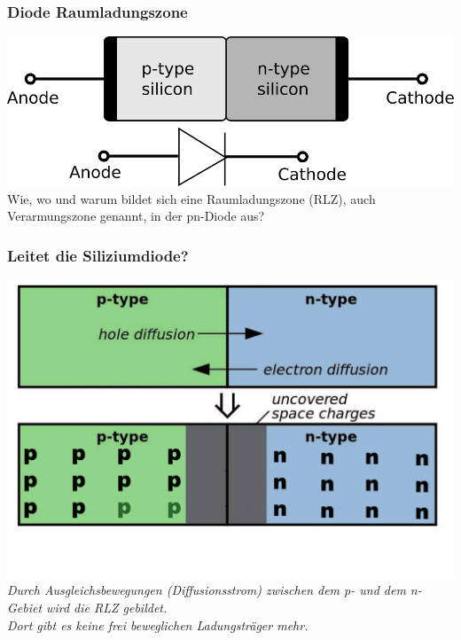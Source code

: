 \begin{frame}
  \frametitle{Diode Raumladungszone}
  \begin{center}
    \includegraphics[width=1\textwidth,height=.7\textheight,keepaspectratio]{a05/diode_with_electrical_symbol.png}
    \tiny \hyperlink{refs}{\cite{wm}} \\[3em]
    \large Wie, wo und warum bildet sich eine Raumladungszone (RLZ), auch Verarmungszone genannt, in der pn-Diode aus?
  \end{center}
\end{frame}

\begin{frame}
  \frametitle{Leitet die Siliziumdiode?}
  \begin{center}
    \includegraphics[width=1\textwidth,height=.65\textheight,keepaspectratio]{a05/Pn_Junction_Diffusion_and_Drift.pdf}\\
    \emph{Durch Ausgleichsbewegungen (Diffusionsstrom) zwischen dem p- und dem n-Gebiet wird die RLZ gebildet.\\
    Dort gibt es keine frei beweglichen Ladungsträger mehr.}\
  \end{center}
\end{frame}

